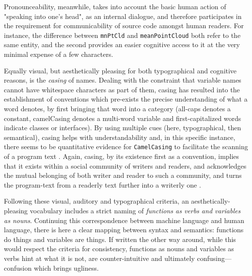 Pronounceability, meanwhile, takes into account the basic human action of "speaking into one's head", as an internal dialogue, and therefore participates in the requirement for communicability of source code amongst human readers. For instance, the difference between \lstinline{mnPtCld} and \lstinline{meanPointCloud} both refer to the same entity, and the second provides an easier cognitive access to it at the very minimal expense of a few characters.

Equally visual, but aesthetically pleasing for both typographical and cognitive reasons, is the \emph{casing} of names. Dealing with the constraint that variable names cannot have whitespace characters as part of them, casing has resulted into the establishment of conventions which pre-exists the precise understanding of what a word denotes, by first bringing that word into a category (all-caps denotes a constant, camelCasing denotes a multi-word variable and first-capitalized words indicate classes or interfaces). By using multiple cues (here, typographical, then semantical), casing helps with understandability and, in this specific instance, there seems to be quantitative evidence for \lstinline{CamelCasing} to facilitate the scanning of a program text \citep{binkley_camelcase_2009}. Again, casing, by its existence first as a convention, implies that it exists within a social community of writers and readers, and acknowledges the mutual belonging of both writer and reader to such a community, and turns the program-text from a readerly text further into a writerly one \citep{barthes_bruissement_1984}.

Following these visual, auditory and typographical criteria, an aesthetically-pleasing vocabulary includes a strict naming of \emph{functions as verbs and variables as nouns}. Continuing this correspondence between machine language and human language, there is here a clear mapping between syntax and semantics: functions do things and variables are things. If written the other way around, while this would respect the criteria for consistency, functions as nouns and variables as verbs hint at what it is not, are counter-intuitive and ultimately confusing—confusion which brings ugliness.

